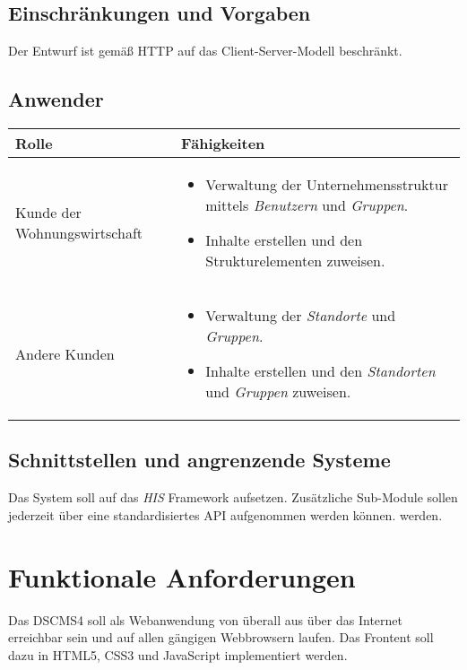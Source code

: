\documentclass[a4paper]{article}
\begin{document}
	\subsection{Einschränkungen und Vorgaben}
	Der Entwurf ist gemäß HTTP auf das Client-Server-Modell beschränkt.
	
	\subsection{Anwender}	
	\begin{tabular}{|p{}|p{}|}
	\hline
	Rolle & Fähigkeiten \\
	\hline
	Kunde der Wohnungswirtschaft &
		\begin{itemize}
		\item Verwaltung der Unternehmensstruktur mittels \emph{Benutzern} und \emph{Gruppen}.
		\item Inhalte erstellen und den Strukturelementen zuweisen.
		\end{itemize} \\
	\hline
	Andere Kunden & 
		\begin{itemize}
		\item Verwaltung der \emph{Standorte} und \emph{Gruppen}.
		\item Inhalte erstellen und den \emph{Standorten} und \emph{Gruppen} zuweisen.
		\end{itemize} \\
	\hline
	\end{tabular}
	\subsection{Schnittstellen und angrenzende Systeme}
	Das System soll auf das \emph{HIS} Framework aufsetzen.
	Zusätzliche Sub-Module sollen jederzeit über eine standardisiertes API aufgenommen werden können. werden.
	\pagebreak
	
	\section{Funktionale Anforderungen}
	Das DSCMS4 soll als Webanwendung von überall aus über das Internet erreichbar sein und auf allen gängigen Webbrowsern laufen.
	Das Frontent soll dazu in HTML5, CSS3 und JavaScript implementiert werden.
\end{document}
